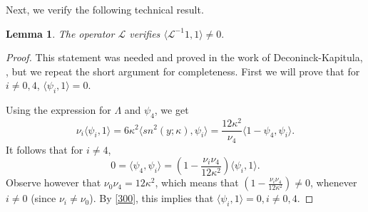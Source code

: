 \documentclass[final,11pt,leqno]{amsart}
\newtheorem{lemma}{Lemma}
\begin{document}
Next, we verify the following technical result.
\begin{lemma}
\label{l2}
The operator ${\mathcal L}$ verifies $ \langle \mathcal{L}^{-1}1,1\rangle \neq 0.$
\end{lemma}

\begin{proof}
This statement was needed and proved in the work of Deconinck-Kapitula, \cite{DK}, but we repeat the short argument for completeness. 
First we will prove that for $i\neq 0, 4$, $\langle \psi_i, 1\rangle=0.$

  Using the expression for $\Lambda$ and $\psi_4$, we get
    $$\nu_i \langle \psi_i,1\rangle =6\kappa^2 \langle sn^2(y; \kappa), \psi_i\rangle={\frac{12\kappa^2}{\nu_4}}\langle 1-\psi_4, \psi_i\rangle.
    $$
It follows that for $i\neq 4$,
\begin{equation}
\label{300}
0=\langle \psi_4, \psi_i\rangle=\left( 1-{\frac{\nu_i
\nu_4}{12\kappa^2}}\right)\langle \psi_i,1\rangle .
\end{equation}
Observe however that $\nu_0 \nu_4=12\kappa^2$, which means that $  \left( 1-{\frac{\nu_i
\nu_4}{12\kappa^2}}\right)\neq 0$, whenever $i\neq 0$ (since $\nu_i\neq \nu_0$). By \eqref{300}, this implies that ${\langle {\psi_i},{1} \rangle}=0, i\neq 0,4$.


\end{proof}
\end{document}
